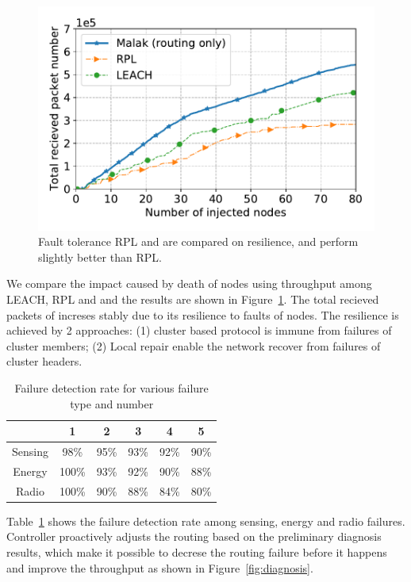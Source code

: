 \begin{figure}[htbp]
	\centering
	\includegraphics[width=.95\columnwidth]{Figure/fault_tolerance}
	\vspace{-0.1in}
	\caption{Fault tolerance
		\textnormal{
			RPL and {\sdn} are compared on resilience, and {\sdn} perform
			slightly better than RPL.
		}}
	\label{fig:fault_tolerance}
\end{figure}

We compare the impact caused by death of nodes using throughput among LEACH, RPL
and {\sdn} and the results are shown in Figure~\ref{fig:fault_tolerance}. The
total recieved packets of {\sdn} increses stably due to its resilience to faults
of nodes. The resilience is achieved by 2 approaches: (1) cluster based protocol
is immune from failures of cluster members; (2) Local repair enable the network
recover from failures of cluster headers.

\begin{table}[htbp]
	\centering
	\caption{Failure detection rate for various failure type and number}
	\label{tab:diagnosis}
	\begin{tabular}{|c||c|c|c|c|c|}
		\hline
		\diagbox{Type}{Failures} & 1 & 2 & 3 & 4 & 5\\
		\hline
		\hline
		Sensing & 98\% & 95\% & 93\% & 92\% & 90\%\\
		\hline
		Energy & 100\% & 93\% & 92\% & 90\% & 88\%\\
		\hline
		Radio & 100\% & 90\% & 88\% & 84\% & 80\%\\
		\hline
	\end{tabular}
\end{table}

Table~\ref{tab:diagnosis} shows the failure detection rate among sensing, energy
and radio failures. Controller proactively adjusts the routing based on the
preliminary diagnosis results, which make it possible to decrese the routing
failure before it happens and improve the throughput as shown in
Figure~\ref{fig:diagnosis}.

